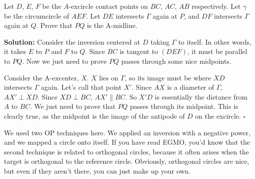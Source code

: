 \documentclass{scrartcl}
\begin{document}
\begin{problem} Let $D$, $E$, $F$ be the $A$-excircle contact points on $BC$, $AC$, $AB$ respectively. Let $\gamma$ be the circumcircle of $AEF$. Let $DE$ intersects $\Gamma$ again at $P$, and $DF$ intersects $\Gamma$ again at $Q$. Prove that $PQ$ is the A-midline. 
\end{problem}
\textbf{Solution:} Consider the inversion centered at $D$ taking $\Gamma$ to itself. In other words, it takes $E$ to $P$ and $F$ to $Q$. Since $BC$ is tangent to $(DEF)$, it must be parallel to $PQ$. Now we just need to prove $PQ$ passes through some nice midpoints. 

Consider the A-excenter, $X$. $X$ lies on $\Gamma$, so its image must be where $XD$ intersects $\Gamma$ again. Let's call that point $X'$. Since $AX$ is a diameter of $\Gamma$, $AX' \perp XD$. Since $XD \perp BC$, $AX' \parallel BC$. So $X'D$ is essentially the distance from $A$ to $BC$. We just need to prove that $PQ$ passes through its midpoint. This is clearly true, as the midpoint is the image of the antipode of $D$ on the excircle. $\square$\newline 

We used two OP techniques here. We applied an inversion with a negative power, and we mapped a circle onto itself. If you have read EGMO, you'd know that the second technique is related to orthogonal circles, because it often arises when the target is orthogonal to the reference circle. Obviously, orthogonal circles are nice, but even if they aren't there, you can just make up your own. \newline
\end{document}
